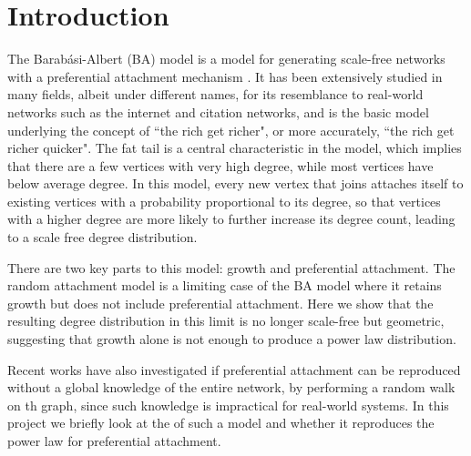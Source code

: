 \section{Introduction}\label{section:introduction}

The Barab\'asi-Albert (BA) model is a model for generating scale-free networks with a preferential attachment mechanism \citep{Barabasi1999}. It has been extensively studied in many fields, albeit under different names, for its resemblance to real-world networks such as the internet and citation networks, and is the basic model underlying the concept of ``the rich get richer", or more accurately, ``the rich get richer quicker". The fat tail is a central characteristic in the model, which implies that there are a few vertices with very high degree, while most vertices have below average degree. In this model, every new vertex that joins attaches itself to existing vertices with a probability proportional to its degree, so that vertices with a higher degree are more likely to further increase its degree count, leading to a scale free degree distribution. 

There are two key parts to this model: growth and preferential attachment. The random attachment model is a limiting case of the BA model where it retains growth but does not include preferential attachment. Here we show that the resulting degree distribution in this limit is no longer scale-free but geometric, suggesting that growth alone is not enough to produce a power law distribution. 

Recent works \citep{Saramaki2004,Cannings2013,J.P.Saramaki2004} have also investigated if preferential attachment can be reproduced without a global knowledge of the entire network, by performing a random walk on th graph, since such knowledge is impractical for real-world systems. In this project we briefly look at the of such a model and whether it reproduces the power law for preferential attachment. 